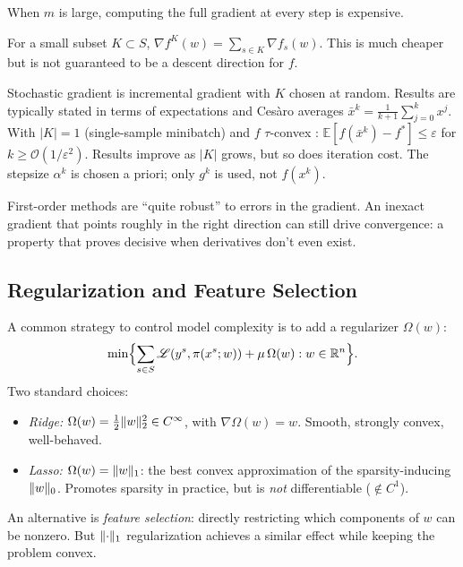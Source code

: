 When $m$ is large, computing the full gradient at every step is expensive.

\begin{definition}\label{def:incremental-grad}
	For a small subset $K \subset S$,
	$\nabla f^K(w) = \sum_{s \in K} \nabla f_s(w)$.
	This is much cheaper but is not guaranteed to be a descent direction for $f$.
\end{definition}

\begin{definition}\label{def:stochastic-grad}
	Stochastic gradient is incremental gradient with $K$ chosen at random.
	Results are typically stated in terms of expectations and Cesàro averages
	$\bar{x}^k = \frac{1}{k+1} \sum_{j=0}^{k} x^j$.
	With $|K| = 1$ (single-sample minibatch) and $f$ $\tau$-convex \cite{bubeck2015}:
	$\mathbb{E}[f(\bar{x}^k) - f^*] \leq \varepsilon$ for $k \geq \mathcal{O}(1/\varepsilon^2)$.
	Results improve as $|K|$ grows, but so does iteration cost.
	The stepsize $\alpha^k$ is chosen a priori; only $g^k$ is used, not $f(x^k)$.
\end{definition}

First-order methods are ``quite robust'' to errors in the gradient.
An inexact gradient that points roughly in the right direction can still drive convergence: a property that proves decisive when derivatives don't even exist.


\subsection{Regularization and Feature Selection}\label{sec:regularization}

A common strategy to control model complexity is to add a regularizer $\Omega(w)$:
\begin{equation}\label{eq:regularized-problem}
	\min\Bigl\{\sum_{s \in S} \mathcal{L}(y^s, \pi(x^s; w)) + \mu\, \Omega(w) : w \in \mathbb{R}^n\Bigr\}.
\end{equation}
Two standard choices:
\begin{itemize}
	\item \textit{Ridge:} $\Omega(w) = \frac{1}{2}\lVert w\rVert_2^2 \in C^\infty$, with $\nabla\Omega(w) = w$.
		Smooth, strongly convex, well-behaved.
	\item \textit{Lasso:} $\Omega(w) = \lVert w\rVert_1$: the best convex approximation of the sparsity-inducing $\lVert w\rVert_0$.
		Promotes sparsity in practice, but is \emph{not} differentiable ($\notin C^1$).
\end{itemize}
An alternative is \emph{feature selection}: directly restricting which components of $w$ can be nonzero.
But $\lVert\cdot\rVert_1$ regularization achieves a similar effect while keeping the problem convex.

